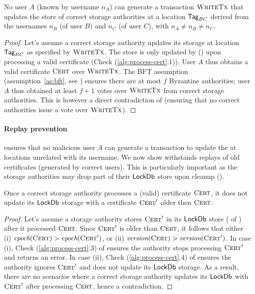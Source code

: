 \begin{theorem} \label{th:autenticated-writes}
    No user $A$ (known by username $n_A$) can generate a transaction $\textsc{WriteTx}$ that updates the store of correct storage authorities at a location $\textsf{Tag}_{BC}$ derived from the usernames $n_B$ (of user $B$) and $n_C$ (of user $C$), with $n_A \neq n_B \neq n_C$.
\end{theorem}
\begin{proof}
    Let's assume a correct storage authority updates its storage at location $\textsf{Tag}_{BC}$ as specified by $\textsc{WriteTx}$.
    The \sysname store is only updated by  () upon processing a valid certificate (Check (\ref{alg:process-cert}.1)). User $A$ thus obtains a valid certificate $\textsc{Cert}$ over $\textsc{WriteTx}$.
    The BFT assumption (assumption~\ref{as:bft}, see ) ensures there are at most $f$ Byzantine authorities; user $A$ thus obtained at least $f+1$ votes over $\textsc{WriteTx}$ from correct storage authorities. This is however a direct contradiction of  (ensuring that no correct authorities issue a vote over $\textsc{WriteTx}$).
\end{proof}

\paragraph{Replay prevention}
 ensures that no malicious user $A$ can generate a transaction to update the \sysname at locations unrelated with its username. We now show \sysname withstands replays of old certificates (generated by correct users). This is particularly important as the storage authorities may drop part of their $\textsf{LockDb}$ store upon cleanup ().

\begin{theorem}
    Once a correct storage authority processes a (valid) certificate $\textsc{Cert}$, it does not update its $\textsf{LockDb}$ storage with a certificate $\textsc{Cert}'$ older then $\textsc{Cert}$.
\end{theorem}
\begin{proof}
    Let's assume a storage authority stores $\textsc{Cert}'$ in its $\textsf{LockDb}$ store ( of ) after it processed $\textsc{Cert}$.
    Since $\textsc{Cert}'$ is older than $\textsc{Cert}$, it follows that either (i) $\emph{epoch}(\textsc{Cert}) > \emph{epoch}(\textsc{Cert}')$, or (ii) $\emph{version}(\textsc{Cert}) > \emph{version}(\textsc{Cert}')$.
    In case (i), Check (\ref{alg:process-cert}.3) of  ensures the authority stops processing $\textsc{Cert}'$ and returns an error.
    In case (ii), Check (\ref{alg:process-cert}.4) of  ensures the authority ignores $\textsc{Cert}'$ and does not update its $\textsf{LockDb}$ storage.
    As a result, there are no scenarios where a correct storage authority updates its $\textsf{LockDb}$ with $\textsc{Cert}'$ after processing $\textsc{Cert}$, hence a contradiction.
\end{proof}

